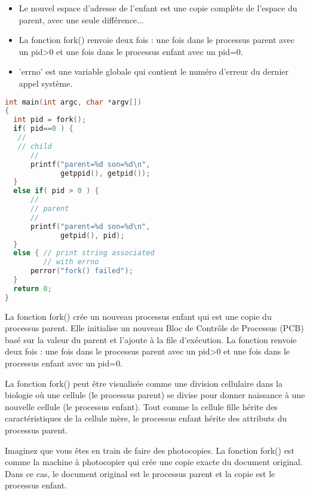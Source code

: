 \documentclass[12pt]{report}
\begin{document}
\begin{itemize} 
\item Le nouvel espace d'adresse de l'enfant est une copie complète de l'espace du parent, avec une seule différence... 
\item La fonction fork() renvoie deux fois : une fois dans le processus parent avec un pid>0 et une fois dans le processus enfant avec un pid=0. 
\item 'errno' est une variable globale qui contient le numéro d'erreur du dernier appel système. 
\end{itemize}
\begin{lstlisting}[language=C] 
int main(int argc, char *argv[]) 
{ 
  int pid = fork(); 
  if( pid==0 ) { 
   // 
   // child 
      // 
      printf("parent=%d son=%d\n", 
             getppid(), getpid()); 
  } 
  else if( pid > 0 ) { 
      // 
      // parent 
      // 
      printf("parent=%d son=%d\n", 
             getpid(), pid); 
  } 
  else { // print string associated 
         // with errno   
      perror("fork() failed");  
  } 
  return 0; 
} 
\end{lstlisting}
\begin{tcolorbox}[colback=yellow!5, colframe=yellow!80!black, title={\faBookmark À retenir}] 
La fonction fork() crée un nouveau processus enfant qui est une copie du processus parent. Elle initialise un nouveau Bloc de Contrôle de Processus (PCB) basé sur la valeur du parent et l'ajoute à la file d'exécution. La fonction renvoie deux fois : une fois dans le processus parent avec un pid>0 et une fois dans le processus enfant avec un pid=0. 
\end{tcolorbox}
\begin{tcolorbox}[colback=green!5, colframe=green!75!black, title={\faLightbulb Intuition}] 
La fonction fork() peut être visualisée comme une division cellulaire dans la biologie où une cellule (le processus parent) se divise pour donner naissance à une nouvelle cellule (le processus enfant). Tout comme la cellule fille hérite des caractéristiques de la cellule mère, le processus enfant hérite des attributs du processus parent. 
\end{tcolorbox}
\begin{tcolorbox}[colback=blue!5, colframe=blue!75!black, title={\faLightbulb Vulgarisation simple}] 
Imaginez que vous êtes en train de faire des photocopies. La fonction fork() est comme la machine à photocopier qui crée une copie exacte du document original. Dans ce cas, le document original est le processus parent et la copie est le processus enfant. 
\end{tcolorbox}
\end{document}
